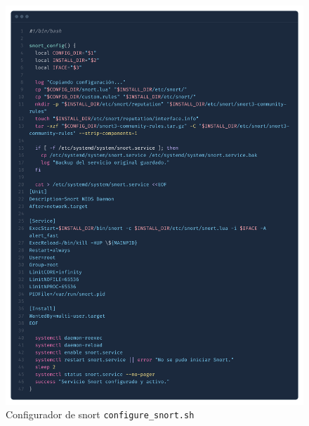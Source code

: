 \documentclass[12pt,a4paper]{report}
\begin{document}
\begin{figure}[H]
	\centering
	\includegraphics[scale=0.12]{script_automatico/8.png}
	\caption{Configurador de snort \texttt{configure\_snort.sh}}
	\label{fig:configure-snort}
\end{figure}
\end{document}
